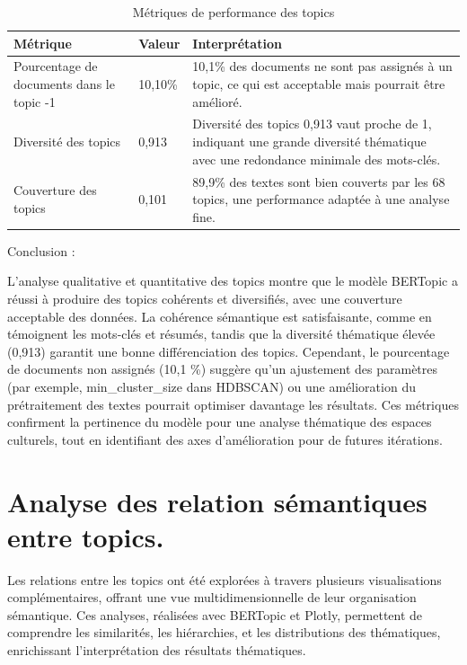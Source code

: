 \documentclass[mstat,12pt]{unswthesis}
\begin{document}
\begin{table}[h]
    \centering
    \caption{Métriques de performance des topics}
    \begin{tabular}{|p{4cm}|p{2.5cm}|p{7cm}|}
        \hline
        \textbf{Métrique} & \textbf{Valeur} & \textbf{Interprétation} \\
        \hline
        Pourcentage de documents dans le topic -1 & 10,10\% & 10,1\% des documents ne sont pas assignés à un topic, ce qui est acceptable mais pourrait être amélioré. \\
        \hline
        Diversité des topics & 0,913 & Diversité des topics 0,913 vaut proche de 1, indiquant une grande diversité thématique avec une redondance minimale des mots-clés. \\
        \hline
        Couverture des topics & 0,101 & 89,9\% des textes sont bien couverts par les 68 topics, une performance adaptée à une analyse fine. \\
        \hline
    \end{tabular}
    \label{tab:topic_metrics}
\end{table}

\bigskip
Conclusion : 

L’analyse qualitative et quantitative des topics montre que le modèle BERTopic a réussi à produire des topics cohérents et diversifiés, avec une couverture acceptable des données. La cohérence sémantique est satisfaisante, comme en témoignent les mots-clés et résumés, tandis que la diversité thématique élevée (0,913) garantit une bonne différenciation des topics. Cependant, le pourcentage de documents non assignés (10,1 \%) suggère qu’un ajustement des paramètres (par exemple, min\_cluster\_size dans HDBSCAN) ou une amélioration du prétraitement des textes pourrait optimiser davantage les résultats. Ces métriques confirment la pertinence du modèle pour une analyse thématique des espaces culturels, tout en identifiant des axes d’amélioration pour de futures itérations.


\section{Analyse des relation sémantiques entre topics. }

Les relations entre les topics ont été explorées à travers plusieurs visualisations 
complémentaires, offrant une vue multidimensionnelle de leur organisation sémantique. Ces 
analyses, réalisées avec BERTopic et Plotly, permettent de comprendre les similarités, les 
hiérarchies, et les distributions des thématiques, enrichissant l’interprétation des résultats 
thématiques.
\end{document}
